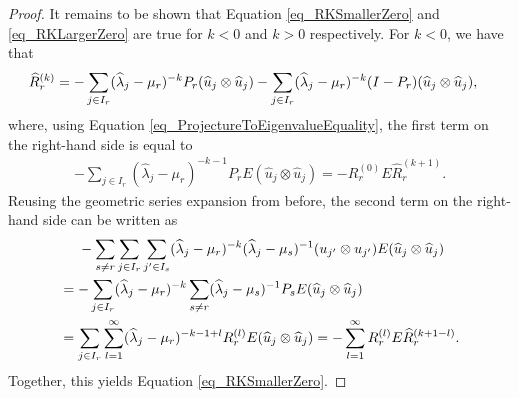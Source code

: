 \documentclass[10pt,a4paper]{amsart}
\begin{document}
\begin{proof}
  It remains to be shown that Equation \eqref{eq_RKSmallerZero} and
  \eqref{eq_RKLargerZero} are true for \( k < 0 \) and \( k > 0 \) respectively. 
  For \( k < 0 \), we have that
  \begin{align}
          \widehat{R}_{r}^{ (k) } 
    & = 
        - \sum_{ j \in I_{r} } 
          ( \widehat{ \lambda }_{j} - \mu_{r} )^{-k} 
          P_{r} ( \widehat{u}_{j} \otimes \widehat{u}_{j} )
        - \sum_{ j \in I_{r} } 
          ( \widehat{ \lambda }_{j} - \mu_{r} )^{-k} 
          ( I - P_{r} ) ( \widehat{u}_{j} \otimes \widehat{u}_{j} ),
    \notag 
  \end{align}
  where, using Equation \eqref{eq_ProjectureToEigenvalueEquality}, the first
  term on the right-hand side is equal to
  \begin{align}
      - \sum_{ j \in I_{r} } 
        ( \widehat{ \lambda }_{j} - \mu_{r} )^{ - k - 1 } 
        P_{r} E ( \widehat{u}_{j} \otimes \widehat{u}_{j} ) 
    = 
      - R_{r}^{ (0) } E \widehat{R}_{r}^{ ( k + 1 ) }.
  \end{align}
  Reusing the geometric series expansion from before, the second term on the
  right-hand side can be written as
  \begin{align}
    & \ \ \ \
        - \sum_{s \ne r} \sum_{ j \in I_{r} } \sum_{ j' \in I_{s} } 
          ( \widehat{ \lambda }_{j} - \mu_{r} )^{-k} 
          ( \widehat{ \lambda }_{j} - \mu_{s} )^{-1}
          ( u_{j'} \otimes u_{j'} ) E ( \widehat{u}_{j} \otimes \widehat{u}_{j} ) 
    \\
    & = 
        - \sum_{ j \in I_{r} } ( \widehat{ \lambda }_{j} - \mu_{r} )^{-k} 
          \sum_{ s \ne r } 
          ( \widehat{ \lambda }_{j} - \mu_{s} )^{-1}
          P_{s} E ( \widehat{u}_{j} \otimes \widehat{u}_{j} )
    \notag
    \\
    & =
          \sum_{ j \in I_{r} } \sum_{l = 1}^{ \infty } 
          ( \widehat{ \lambda }_{j} - \mu_{r} )^{-k - 1 + l} 
          R_{r}^{ (l) } E ( \widehat{u}_{j} \otimes \widehat{u}_{j} ) 
    = 
        - \sum_{l = 1}^{ \infty } 
          R_{r}^{ (l) } E \widehat{R}_{r}^{ (k + 1 - l) }.
    \notag
  \end{align}
  Together, this yields Equation \eqref{eq_RKSmallerZero}.


\end{proof}
\end{document}

